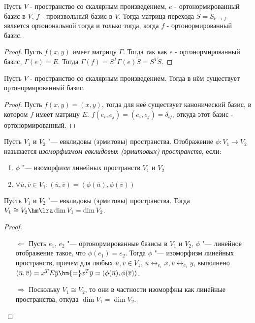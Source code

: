 \begin{proposition}
    Пусть $V$ - пространство со скалярным произведением, $e$ - ортонормированный базис в $V$, 
    $f$ - произвольный базис в $V$. Тогда матрица перехода $S = S_{e \to f}$ является 
    ортонональной тогда и только тогда, когда $f$ - ортонормированный базис.
\end{proposition}

\begin{proof}
    Пусть $f(x, y)$ имеет матрицу $\Gamma$. Тогда так как $e$ - ортонормированный базис, $\Gamma(e) = E$.
    Тогда $\Gamma(f) = S^T \Gamma(e) \tilde{S} = S^T \tilde{S}$.
\end{proof}

\begin{proposition}
    Пусть $V$ - пространство со скалярным произведением. Тогда в нём существует ортонормированный базис.
\end{proposition}

\begin{proof}
    Пусть $f(x, y) = (x, y)$, тогда для неё существует канонический базис, в котором $f$ имеет 
    матрицу $E$. $f(e_i, e_j) = (e_i, e_j) = \delta_{ij}$, откуда этот базис - ортонормированный.
\end{proof}

\begin{definition}
    Пусть $V_1$ и $V_2$ "--- евклидовы (эрмитовы) пространства. Отображение $\phi: V_1 \rightarrow V_2$ называется \textit{изоморфизмом евклидовых (эрмитовых) пространств}, если:
    \begin{enumerate}
        \item $\phi$ "--- изоморфизм линейных пространств $V_1$ и $V_2$
        \item $\forall \overline{u}, \overline{v} \in V_1: (\overline{u}, \overline{v}) = (\phi(\overline{u}), \phi(\overline{v}))$
    \end{enumerate}
\end{definition}

\begin{theorem}
    Пусть $V_1$ и $V_2$ "--- евклидовы (эрмитовы) пространства. Тогда $V_1 \cong V_2 \hm\lra \dim{V_1} = \dim{V_2}$.
\end{theorem}

\begin{proof}~
    \begin{itemize}
        \item[$\Leftarrow$]Пусть $e_1$, $e_2$ "--- ортонормированные базисы в $V_1$ и $V_2$, $\phi$ "--- линейное отображение такое, что $\phi(e_1) = e_2$. Тогда $\phi$ "--- изоморфизм линейных пространств, причем для любых $\overline{u}, \overline{v} \in V_1$, $\overline{u} \leftrightarrow_{e_1} x, \overline{v} \leftrightarrow_{e_1} y$, выполнено $(\overline{u}, \overline{v}) = x^TE\overline{y} \hm{=} x^T\overline{y} = (\phi(\overline{u}), \phi(\overline{v}))$.
        \item[$\Rightarrow$]Поскольку $V_1 \cong V_2$, то они в частности изоморфны как линейные пространства, откуда $\dim{V_1} = \dim{V_2}$.\qedhere
    \end{itemize}
\end{proof}

